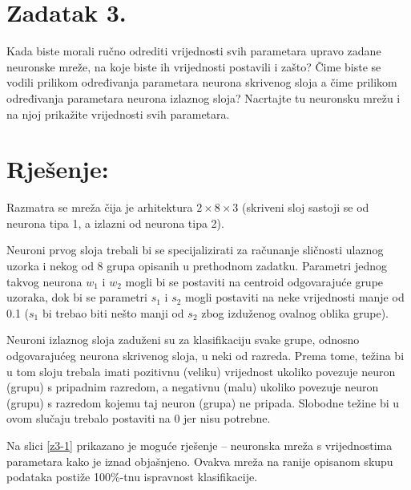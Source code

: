 \documentclass{article}
\begin{document}
\pagebreak

\section*{Zadatak 3.}
Kada biste morali ručno odrediti vrijednosti svih parametara
upravo zadane neuronske mreže, na koje biste ih vrijednosti
postavili i zašto? Čime biste se vodili prilikom određivanja
parametara neurona skrivenog sloja a čime prilikom
određivanja parametara neurona izlaznog sloja? Nacrtajte tu
neuronsku mrežu i na njoj prikažite vrijednosti svih
parametara.

\section*{Rješenje:}
Razmatra se mreža čija je arhitektura $ 2 \times 8 \times 3 $
(skriveni sloj sastoji se od neurona tipa 1, a izlazni od
neurona tipa 2).

Neuroni prvog sloja trebali bi se specijalizirati za
računanje sličnosti ulaznog uzorka i nekog od 8 grupa
opisanih u prethodnom zadatku. Parametri jednog takvog
neurona $ w_1 $ i $ w_2 $ mogli bi se postaviti na centroid
odgovarajuće grupe uzoraka, dok bi se parametri $ s_1 $ i
$ s_2 $ mogli postaviti na neke vrijednosti manje od 0.1
($ s_1 $ bi trebao biti nešto manji od $ s_2 $ zbog izduženog
ovalnog oblika grupe).

Neuroni izlaznog sloja zaduženi su za klasifikaciju svake
grupe, odnosno odgovarajućeg neurona skrivenog sloja, u neki
od razreda. Prema tome, težina bi u tom sloju trebala imati
pozitivnu (veliku) vrijednost ukoliko povezuje neuron (grupu)
s pripadnim razredom, a negativnu (malu) ukoliko povezuje
neuron (grupu) s razredom kojemu taj neuron (grupa) ne
pripada. Slobodne težine bi u ovom slučaju trebalo postaviti
na 0 jer nisu potrebne.

Na slici \ref{z3-1} prikazano je moguće rješenje -- neuronska
mreža s vrijednostima parametara kako je iznad objašnjeno.
Ovakva mreža na ranije opisanom skupu podataka postiže
100\%-tnu ispravnost klasifikacije.
\end{document}
